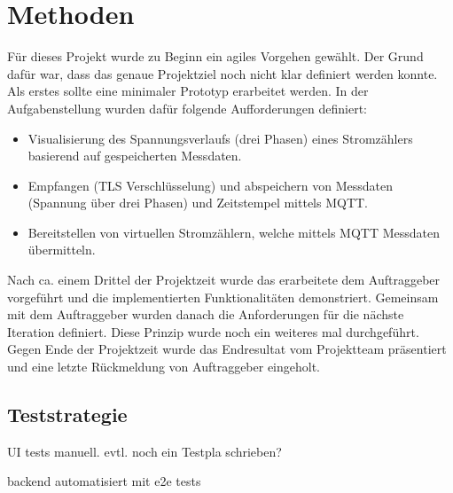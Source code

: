 \chapter{Methoden}
Für dieses Projekt wurde zu Beginn ein agiles Vorgehen gewählt.
Der Grund dafür war, dass das genaue Projektziel noch nicht klar definiert werden konnte.
Als erstes sollte eine minimaler Prototyp erarbeitet werden. In der Aufgabenstellung \cite{aufgabenstellung} wurden dafür folgende Aufforderungen definiert: 
\begin{itemize}
\item Visualisierung des Spannungsverlaufs (drei Phasen) eines Stromzählers
basierend auf gespeicherten Messdaten.
\item Empfangen (TLS Verschlüsselung) und abspeichern von Messdaten (Spannung über drei Phasen) und
Zeitstempel mittels MQTT.
\item Bereitstellen von virtuellen Stromzählern, welche mittels MQTT Messdaten
übermitteln.
\end{itemize}
Nach ca. einem Drittel der Projektzeit wurde das erarbeitete dem Auftraggeber vorgeführt und die implementierten Funktionalitäten demonstriert.
Gemeinsam mit dem Auftraggeber wurden danach die Anforderungen für die nächste Iteration definiert.
Diese Prinzip wurde noch ein weiteres mal durchgeführt. 
Gegen Ende der Projektzeit wurde das Endresultat vom Projektteam präsentiert und eine letzte Rückmeldung von Auftraggeber eingeholt. 




\section{Teststrategie}
UI tests manuell. evtl. noch ein Testpla schrieben?

backend automatisiert mit e2e tests

